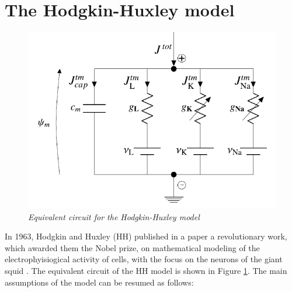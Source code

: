 \documentclass[12pt, a4paper]{report}
\begin{document}
\section{The Hodgkin-Huxley model}

\begin{figure}[H]
	\begin{center}
		\includegraphics[scale=0.65]{HH.png} 
	\end{center} 
	\caption{\textit{Equivalent circuit for the Hodgkin-Huxley model}} \label{HH}
	
\end{figure}


In 1963, Hodgkin and Huxley (HH) published in a paper a revolutionary work, which awarded them the Nobel prize, on mathematical modeling of the electrophyisiogical activity of cells, with the focus on the neurons of the giant squid \cite{37}.  %
The equivalent circuit of the HH model is shown in Figure \ref{HH}. The main assumptions of the model can be resumed as follows:
\end{document}

